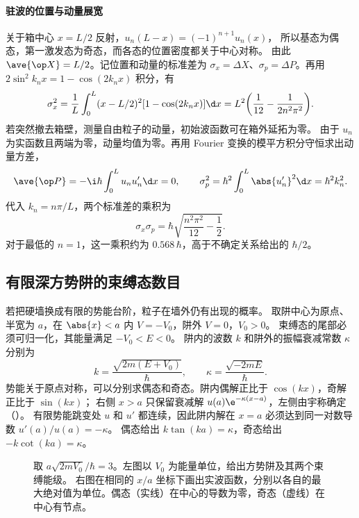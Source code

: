 \paragraph{驻波的位置与动量展宽}
关于箱中心 $x=L/2$ 反射，$u_n(L-x)=(-1)^{n+1}u_n(x)$，
所以基态为偶态，第一激发态为奇态，而各态的位置密度都关于中心对称。
由此 $\ave{\op X}=L/2$。记位置和动量的标准差为 $\sigma_x=\Delta X$、$\sigma_p=\Delta P$。再用 $2\sin^2 k_nx=1-\cos(2k_nx)$ 积分，有
\[
    \sigma_x^2=\frac1L\int_0^L(x-L/2)^2[1-\cos(2k_nx)]\d x
    =L^2\bigg(\frac1{12}-\frac1{2n^2\pi^2}\bigg).
\]
若突然撤去箱壁，测量自由粒子的动量，初始波函数可在箱外延拓为零。
由于 $u_n$ 为实函数且两端为零，动量均值为零。再用 Fourier 变换的模平方积分守恒求出动量方差，
\begin{equation}
    \ave{\op P}=-\i\hbar\int_0^L u_nu_n'\d x=0,\qquad
    \sigma_p^2=\hbar^2\int_0^L\abs{u_n'}^2\d x=\hbar^2k_n^2 .
\end{equation}
代入 $k_n=n\pi/L$，两个标准差的乘积为
\begin{equation}
    \sigma_x\sigma_p=\hbar\sqrt{\frac{n^2\pi^2}{12}-\frac12}.
\end{equation}
对于最低的 $n=1$，这一乘积约为 $0.568\,\hbar$，高于不确定关系给出的 $\hbar/2$。

\subsection{有限深方势阱的束缚态数目}
\label{ss:finite-well}
若把硬墙换成有限的势能台阶，粒子在墙外仍有出现的概率。
取阱中心为原点、半宽为 $a$，在 $\abs{x}<a$ 内 $V=-V_0$，阱外 $V=0$，$V_0>0$。
束缚态的尾部必须可归一化，其能量满足 $-V_0<E<0$。
阱内的波数 $k$ 和阱外的振幅衰减常数 $\kappa$ 分别为
\[
    k=\frac{\sqrt{2m(E+V_0)}}{\hbar},\qquad
    \kappa=\frac{\sqrt{-2mE}}{\hbar}.
\]
势能关于原点对称，可以分别求偶态和奇态。阱内偶解正比于 $\cos(kx)$，奇解正比于 $\sin(kx)$；
右侧 $x>a$ 只保留衰减解 $u(a)\e^{-\kappa(x-a)}$，左侧由宇称确定（）。
有限势能跳变处 $u$ 和 $u'$ 都连续，因此阱内解在 $x=a$ 必须达到同一对数导数 $u'(a)/u(a)=-\kappa$。
偶态给出 $k\tan(ka)=\kappa$，奇态给出 $-k\cot(ka)=\kappa$。
\begin{figure}[htbp]
    \centering
    \caption{取 $a\sqrt{2mV_0}/\hbar=3$。左图以 $V_0$ 为能量单位，给出方势阱及其两个束缚能级。
        右图在相同的 $x/a$ 坐标下画出实波函数，分别以各自的最大绝对值为单位。偶态（实线）在中心的导数为零，奇态（虚线）在中心有节点。}
    \label{fig:finite-well-parity}
\end{figure}

